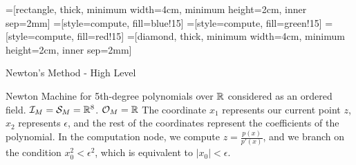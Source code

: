 \documentclass{article}
\begin{document}
=[rectangle, 
                     thick, 
                     minimum width=4cm, 
                     minimum height=2cm, 
                     inner sep=2mm]
=[style=compute, 
                   fill=blue!15]
=[style=compute, 
                   fill=green!15]
=[style=compute, 
                    fill=red!15]
=[diamond, 
                    thick, 
                    minimum width=4cm, 
                    minimum height=2cm, 
                    inner sep=2mm]

{\Huge Newton's Method - High Level}\\


\newpage


Newton Machine for 5th-degree polynomials over $\mathbb{R}$ considered as
an ordered field.  $\mathcal{I}_M = \mathcal{S}_M = \mathbb{R}^8$.
$\mathcal{O}_M = \mathbb{R}$ The coordinate $x_1$ represents our current
point $z$, $x_2$ represents $\epsilon$, and the rest of the
coordinates represent the coefficients of the polynomial. In the
computation node, we compute $z = \frac{p(x)}{p'(x)}$, and we branch
on the condition $x_0^2 < \epsilon^2$, which is equivalent to $|x_0| <
\epsilon$.
\end{document}
